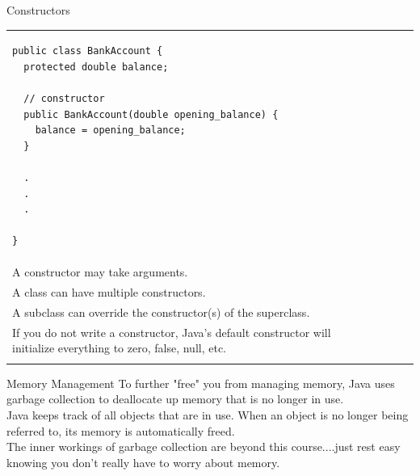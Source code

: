 \documentclass[aspectratio=169]{beamer}
\makeatletter
\newenvironment{splitslide}
{
\centering
\begin{tabular}{@{}m{0.50\textwidth} | m{0.025\textwidth}@{} m{0.4\textwidth}@{} m{0pt}@{}}
}
{
\end{tabular}
}
\makeatother
\begin{document}
\begin{frame}[fragile]{Constructors}
\begin{splitslide}

\centering
\begin{Verbatim}[fontsize=\tiny]
public class BankAccount {
  protected double balance;
  
  // constructor
  public BankAccount(double opening_balance) {
    balance = opening_balance;
  }  

  .
  .
  .
  
}
\end{Verbatim}

&&

\raggedright
\begin{footnotesize}
In Java, a constructor has the name of the class (and no return type). \\
\vspace{0.5em}
A constructor may take arguments. \\
\vspace{0.5em}
A class can have multiple constructors. \\
\vspace{0.5em}
A subclass can override the constructor(s) of the superclass. \\
\vspace{0.5em}
If you do not write a constructor, Java's default constructor will initialize everything to zero, false, null, etc. \\
\end{footnotesize}

\end{splitslide}
\end{frame}



\begin{frame}[fragile]{Memory Management}
To further "free" you from managing memory, Java uses garbage collection to deallocate up memory that is no longer in use. \\
\vspace{1em}
Java keeps track of all objects that are in use. When an object is no longer being referred to, its memory is automatically freed. \\
\vspace{1em}
The inner workings of garbage collection are beyond this course....just rest easy knowing you don't really have to worry about memory. \\
\end{frame}
\end{document}
